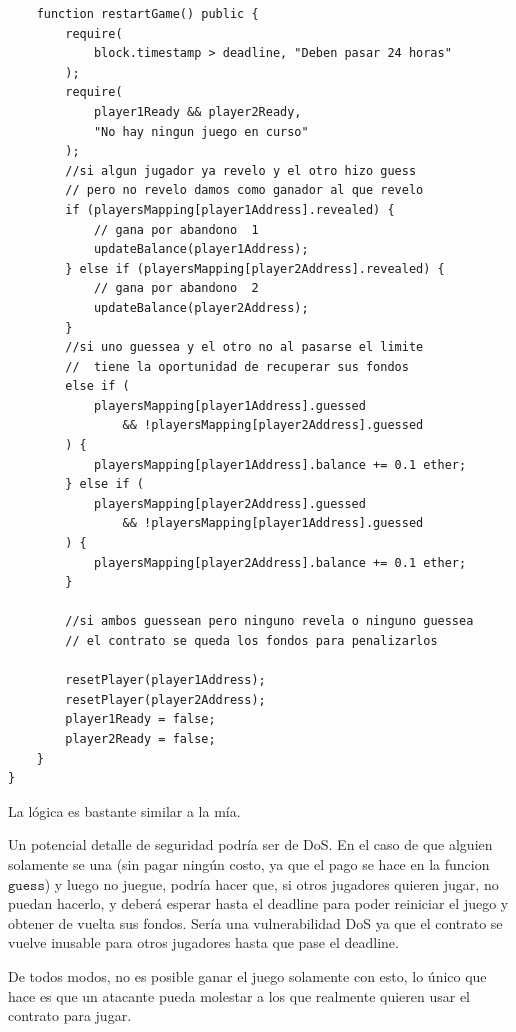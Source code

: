 \documentclass[12pt,addpoints,answers]{exam}
\begin{document}
\begin{questions}
\begin{parts}
\begin{solution}
\begin{verbatim}
    function restartGame() public {
        require(
            block.timestamp > deadline, "Deben pasar 24 horas"
        );
        require(
            player1Ready && player2Ready,
            "No hay ningun juego en curso"
        );
        //si algun jugador ya revelo y el otro hizo guess  
        // pero no revelo damos como ganador al que revelo
        if (playersMapping[player1Address].revealed) {
            // gana por abandono  1
            updateBalance(player1Address);
        } else if (playersMapping[player2Address].revealed) {
            // gana por abandono  2
            updateBalance(player2Address);
        }
        //si uno guessea y el otro no al pasarse el limite
        //  tiene la oportunidad de recuperar sus fondos
        else if (
            playersMapping[player1Address].guessed
                && !playersMapping[player2Address].guessed
        ) {
            playersMapping[player1Address].balance += 0.1 ether;
        } else if (
            playersMapping[player2Address].guessed
                && !playersMapping[player1Address].guessed
        ) {
            playersMapping[player2Address].balance += 0.1 ether;
        }

        //si ambos guessean pero ninguno revela o ninguno guessea 
        // el contrato se queda los fondos para penalizarlos

        resetPlayer(player1Address);
        resetPlayer(player2Address);
        player1Ready = false;
        player2Ready = false;
    }
}

    \end{verbatim}

    La lógica es bastante similar a la mía. 
    
    Un potencial detalle de seguridad podría ser de DoS. En el caso de que alguien solamente se una (sin pagar ningún costo, ya que el pago se hace en la funcion $\texttt{guess}$) y luego no juegue, podría hacer que,
    si otros jugadores quieren jugar, no puedan hacerlo, y deberá esperar hasta el deadline para poder reiniciar el juego y obtener de vuelta sus fondos.
    Sería una vulnerabilidad DoS ya que el contrato se vuelve inusable para otros jugadores hasta que pase el deadline.

    De todos modos, no es posible ganar el juego solamente con esto, lo único que hace es que un atacante pueda molestar a los que realmente quieren usar el contrato para jugar.
    
\end{solution}


\end{parts}
\end{questions}
\end{document}
